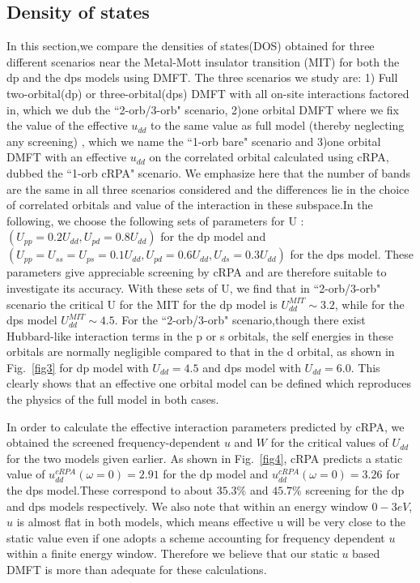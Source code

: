 \documentclass[10pt]{ruthesis}
\begin{document}
{\subsection{\label{DOS}Density of states}
In this section,we compare the densities of states(DOS) obtained for three different scenarios near the Metal-Mott insulator transition (MIT) for both the dp and the dps models using DMFT. The three scenarios we study are: 1) Full two-orbital(dp) or three-orbital(dps) DMFT with all on-site interactions factored in, which we  dub the ``2-orb/3-orb" scenario, 2)one orbital DMFT  where we fix the value of the effective $u_{dd}$ to the same value as full model (thereby neglecting any screening) , which we name the ``1-orb bare" scenario and 3)one orbital DMFT with an effective $u_{dd}$ on the correlated orbital calculated using cRPA,  dubbed the ``1-orb cRPA" scenario. We emphasize here that the number of bands are the same in all three scenarios considered and the differences lie in the choice of correlated orbitals and value of the interaction in these subspace.In the following, we choose the following sets of parameters for U : $(U_{pp}=0.2U_{dd},U_{pd}=0.8U_{dd})$ for the dp model and $(U_{pp}=U_{ss}=U_{ps}=0.1U_{dd},U_{pd}=0.6U_{dd},U_{ds}=0.3U_{dd})$ for the dps model. These parameters give appreciable screening by cRPA and are therefore suitable to investigate its accuracy. With these sets of U, we find that in ``2-orb/3-orb" scenario the critical U for the MIT for the dp model is $U^{MIT}_{dd}\sim 3.2$, while for the dps model  $U^{MIT}_{dd}\sim 4.5$. For the ``2-orb/3-orb" scenario,though there exist Hubbard-like interaction terms in the p or s orbitals, the self energies in these orbitals are normally negligible compared to that in the d orbital, as shown in Fig.~\ref{fig3}  for dp model with $U_{dd}=4.5$ and dps model with $U_{dd}=6.0$. This clearly shows that an effective one orbital model can be defined which reproduces the physics of the full model in both cases.


In order to calculate the effective interaction parameters predicted by cRPA, we obtained  the screened frequency-dependent $u$ and $W$ for the critical values of $U_{dd}$ for the two models given earlier. As shown in Fig.~\ref{fig4}, cRPA predicts a static value of $u^{cRPA}_{dd}(\omega=0)= 2.91$ for the dp model and $u^{cRPA}_{dd}(\omega=0)=3.26$ for the dps model.These correspond to about $35.3\% $ and $45.7\%$ screening for the dp and dps models respectively. We also note that within an energy window $0-3eV$, $u$ is almost flat in both models, which means effective u will be very close to the static value even if one adopts a scheme accounting for frequency dependent $u$ within a finite energy window. Therefore we believe that our static $u$ based DMFT is more than adequate for these calculations.

}
\end{document}
